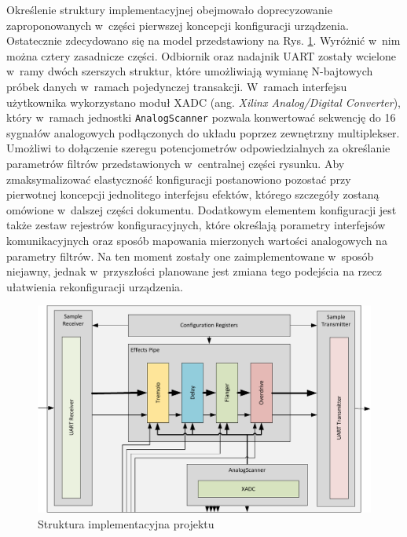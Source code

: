 Określenie struktury implementacyjnej obejmowało doprecyzowanie zaproponowanych w~części pierwszej koncepcji konfiguracji urządzenia. Ostatecznie zdecydowano się na model przedstawiony na Rys. \ref{fpga-structure}. Wyróżnić w~nim można cztery zasadnicze części. Odbiornik oraz nadajnik UART zostały wcielone w~ramy dwóch szerszych struktur, które umożliwiają wymianę N-bajtowych próbek danych w~ramach pojedynczej transakcji. W~ramach interfejsu użytkownika wykorzystano moduł XADC (ang. \textit{Xilinx Analog/Digital Converter}), który w~ramach jednostki \verb|AnalogScanner| pozwala konwertować sekwencję do 16 sygnałów analogowych podłączonych do układu poprzez zewnętrzny multiplekser. Umożliwi to dołączenie szeregu potencjometrów odpowiedzialnych za określanie parametrów filtrów przedstawionych w~centralnej części rysunku. Aby zmaksymalizować elastyczność konfiguracji postanowiono pozostać przy pierwotnej koncepcji jednolitego interfejsu efektów, którego szczegóły zostaną omówione w~dalszej części dokumentu. Dodatkowym elementem konfiguracji jest także zestaw rejestrów konfiguracyjnych, które określają porametry interfejsów komunikacyjnych oraz sposób mapowania mierzonych wartości analogowych na parametry filtrów. Na ten moment zostały one zaimplementowane w~sposób niejawny, jednak w~przyszłości planowane jest zmiana tego podejścia na rzecz ułatwienia rekonfiguracji urządzenia.

\vspace{0.5cm}
\begin{figure}[ht]
    \centering
    \includegraphics[scale=0.75]{img/diagrams/project_diagram.pdf}
    \captionsetup{format=plain,justification=centering}
    \caption{Struktura implementacyjna projektu}
    \label{fpga-structure}
\end{figure}
\vspace{0.5cm}

